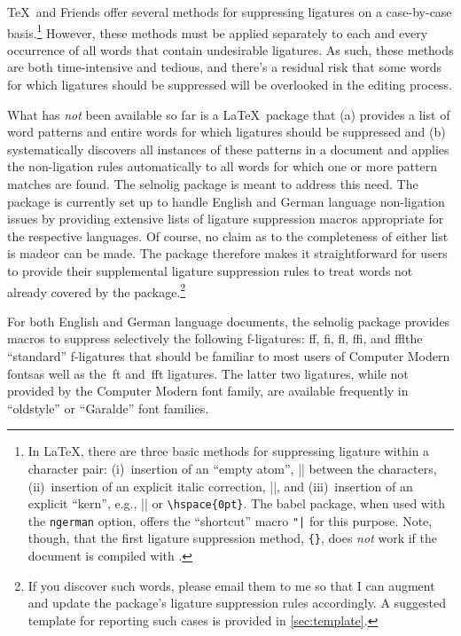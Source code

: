 \documentclass[12pt]{article}
\newcommand{\pkg}[1]{\textsf{#1}}
\newcommand{\opt}[1]{\texttt{#1}}
\begin{document}
\TeX\ and Friends offer several methods for suppressing ligatures on a case-by-case basis.\footnote{In \LaTeX, there are three basic methods for suppressing ligature within a character pair: (i)~insertion of an \enquote{empty atom}, |{}| between the characters, (ii)~insertion of an explicit italic correction, |\/|, and (iii)~insertion of an explicit \enquote{kern}, e.g., |\kern0pt| or \Verb/\hspace{0pt}/. The \pkg{babel} package, when used with the \opt{ngerman} option, offers the \enquote{shortcut} macro \Verb/"|/ for this purpose. Note, though, that the first ligature suppression method, \Verb/{}/, does \emph{not} work if the document is compiled with \LuaLaTeX.} However, these methods must be applied separately to each and every occurrence of all words that contain undesirable ligatures. As such, these methods are both time-intensive and tedious, and there's a residual risk that some words for which ligatures should be suppressed will be overlooked in the editing process. 

What has \emph{not} been available so far is a \LaTeX\ package that (a) provides a list of word patterns and entire words for which ligatures should be suppressed and (b) systematically discovers all instances of these patterns in a document and applies the non-ligation rules automatically to all words for which one or more pattern matches are found. The \pkg{selnolig} package is meant to address this need. The package is currently set up to handle English and German language non-ligation issues by providing extensive lists of ligature suppression macros appropriate for the respective languages. Of course, no claim as to the completeness of either list is made\textemdash or can be made. The package therefore makes it straightforward for users to provide their supplemental ligature suppression rules to treat words not already covered by the package.\footnote{If you discover such words, please email them to me so that I can augment and update the package's ligature suppression rules accordingly. A suggested template for reporting such cases is provided in \cref{sec:template}.} 

For both English and German language documents, the \pkg{selnolig} package provides macros to suppress selectively the following f-ligatures: ff, fi, fl, ffi, and ffl\textemdash the \enquote{standard} f-ligatures that should be familiar to most users of Computer Modern fonts\textemdash as well as the~ft and~fft ligatures. The latter two ligatures, while not provided by the Computer Modern font family, are available frequently in \enquote{oldstyle} or \enquote{Garalde} font families.
\end{document}
